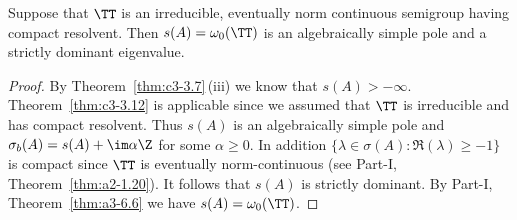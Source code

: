 \begin{corollary}\label{cor:c3-3.17}
	Suppose that $\TT$ is an irreducible, eventually norm continuous semigroup having compact resolvent.
	Then $s(A) = \omega_0(\TT)$ is an algebraically simple pole and a strictly dominant eigenvalue.
\end{corollary}
\begin{proof}
	By Theorem~\ref{thm:c3-3.7}\,(iii) we know that $s(A) > -\infty$. 
	Theorem~\ref{thm:c3-3.12} is applicable since we assumed that $\TT$ is irreducible and has compact resolvent.
	Thus $s(A)$ is an algebraically simple pole and $\sigma_{b}(A) = s(A) + \im\alpha\Z$ for some $\alpha \geq 0$. 
	In addition $\{\lambda \in \sigma(A) \colon \Re(\lambda) \geq -1\}$ is compact since $\TT$ is eventually norm-continuous (see Part-I, Theorem~\ref{thm:a2-1.20}). 
	It follows that $s(A)$ is strictly dominant.
	By Part-I, Theorem~\ref{thm:a3-6.6} we have $s(A) = \omega_0(\TT)$.
\end{proof}

